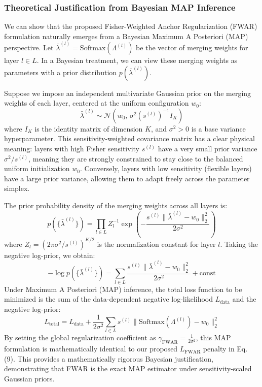 \documentclass{article}
\begin{document}
\subsubsection{Theoretical Justification from Bayesian MAP Inference}
We can show that the proposed Fisher-Weighted Anchor Regularization (FWAR) formulation naturally emerges from a Bayesian Maximum A Posteriori (MAP) perspective. Let $\bar{\lambda}^{(l)} = \text{Softmax}(\Lambda^{(l)})$ be the vector of merging weights for layer $l \in L$. In a Bayesian treatment, we can view these merging weights as parameters with a prior distribution $p(\bar{\lambda}^{(l)})$. 

Suppose we impose an independent multivariate Gaussian prior on the merging weights of each layer, centered at the uniform configuration $w_0$:
\begin{equation}
    \bar{\lambda}^{(l)} \sim \mathcal{N}\left(w_0, \, \sigma^2 \left(s^{(l)}\right)^{-1} I_K\right)
\end{equation}
where $I_K$ is the identity matrix of dimension $K$, and $\sigma^2 > 0$ is a base variance hyperparameter. This sensitivity-weighted covariance matrix has a clear physical meaning: layers with high Fisher sensitivity $s^{(l)}$ have a very small prior variance $\sigma^2 / s^{(l)}$, meaning they are strongly constrained to stay close to the balanced uniform initialization $w_0$. Conversely, layers with low sensitivity (flexible layers) have a large prior variance, allowing them to adapt freely across the parameter simplex.

The prior probability density of the merging weights across all layers is:
\begin{equation}
    p(\{\bar{\lambda}^{(l)}\}) = \prod_{l \in L} Z_l^{-1} \exp\left( - \frac{s^{(l)} \|\bar{\lambda}^{(l)} - w_0\|_2^2}{2\sigma^2} \right)
\end{equation}
where $Z_l = \left(2\pi \sigma^2 / s^{(l)}\right)^{K/2}$ is the normalization constant for layer $l$. Taking the negative log-prior, we obtain:
\begin{equation}
    -\log p(\{\bar{\lambda}^{(l)}\}) = \sum_{l \in L} \frac{s^{(l)} \|\bar{\lambda}^{(l)} - w_0\|_2^2}{2\sigma^2} + \text{const}
\end{equation}
Under Maximum A Posteriori (MAP) inference, the total loss function to be minimized is the sum of the data-dependent negative log-likelihood $L_{\text{data}}$ and the negative log-prior:
\begin{equation}
    L_{\text{total}} = L_{\text{data}} + \frac{1}{2\sigma^2} \sum_{l \in L} s^{(l)} \|\text{Softmax}(\Lambda^{(l)}) - w_0\|_2^2
\end{equation}
By setting the global regularization coefficient as $\gamma_{\text{FWAR}} = \frac{1}{2\sigma^2}$, this MAP formulation is mathematically identical to our proposed $L_{\text{FWAR}}$ penalty in Eq. (9). This provides a mathematically rigorous Bayesian justification, demonstrating that FWAR is the exact MAP estimator under sensitivity-scaled Gaussian priors.
\end{document}
